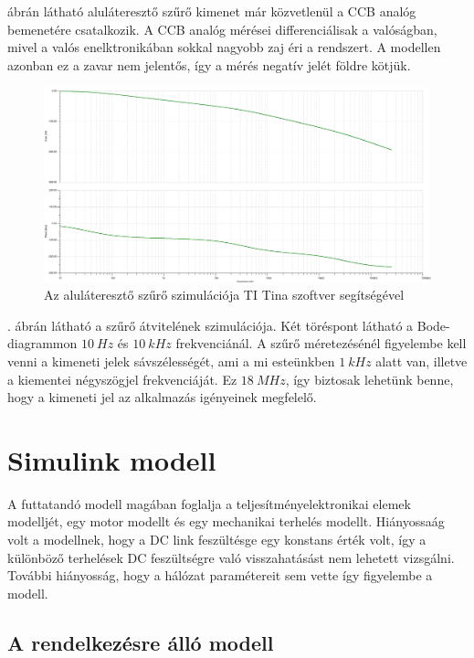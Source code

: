  ábrán látható aluláteresztő szűrő kimenet már közvetlenül a CCB analóg bemenetére csatalkozik. A CCB analóg mérései differenciálisak a valóságban, mivel a valós enelktronikában sokkal nagyobb zaj éri a rendszert. A modellen azonban ez a zavar nem jelentős, így a mérés negatív jelét földre kötjük.

\begin{figure}[!h]
	\centering
	\includegraphics[width = \textwidth]{figures/sigma_delta_sim.png}
	\caption{Az aluláteresztő szűrő szimulációja TI Tina szoftver segítségével} 
	\label{fig:lowpass_sim}
\end{figure}

. ábrán látható a szűrő átvitelének szimulációja. Két töréspont látható a Bode-diagrammon $10\ Hz$ és $10\ kHz$ frekvenciánál. A szűrő méretezésénél figyelembe kell venni a kimeneti jelek sávszélességét, ami a mi esteünkben $1\ kHz$ alatt van, illetve a kiementei négyszögjel frekvenciáját. Ez $18\ MHz$, így biztosak lehetünk benne, hogy a kimeneti jel az alkalmazás igényeinek megfelelő.

\section{Simulink modell}

A futtatandó modell magában foglalja a teljesítményelektronikai elemek modelljét, egy motor modellt és egy mechanikai terhelés modellt. Hiányossaág volt a modellnek, hogy a DC link feszültésge egy konstans érték volt, így a különböző terhelések DC feszültségre való visszahatásást nem lehetett vizsgálni. További hiányosság, hogy a hálózat paramétereit sem vette így figyelembe a modell.

\subsection{A rendelkezésre álló modell}

